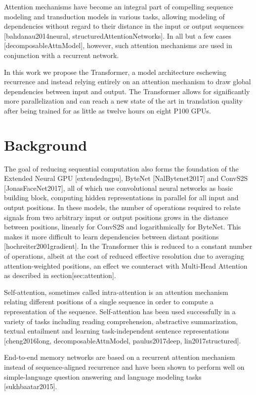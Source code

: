 \documentclass[11pt,a4paper]{article}
\begin{document}
Attention mechanisms have become an integral part of compelling sequence modeling and transduction models in various tasks, allowing modeling of dependencies without regard to their distance in the input or output sequences [bahdanau2014neural, structuredAttentionNetworks]. In all but a few cases [decomposableAttnModel], however, such attention mechanisms are used in conjunction with a recurrent network.

In this work we propose the Transformer, a model architecture eschewing recurrence and instead relying entirely on an attention mechanism to draw global dependencies between input and output. The Transformer allows for significantly more parallelization and can reach a new state of the art in translation quality after being trained for as little as twelve hours on eight P100 GPUs.

\section{Background}

The goal of reducing sequential computation also forms the foundation of the Extended Neural GPU [extendedngpu], ByteNet [NalBytenet2017] and ConvS2S [JonasFaceNet2017], all of which use convolutional neural networks as basic building block, computing hidden representations in parallel for all input and output positions. In these models, the number of operations required to relate signals from two arbitrary input or output positions grows in the distance between positions, linearly for ConvS2S and logarithmically for ByteNet. This makes it more difficult to learn dependencies between distant positions [hochreiter2001gradient]. In the Transformer this is reduced to a constant number of operations, albeit at the cost of reduced effective resolution due to averaging attention-weighted positions, an effect we counteract with Multi-Head Attention as described in section[sec:attention].

Self-attention, sometimes called intra-attention is an attention mechanism relating different positions of a single sequence in order to compute a representation of the sequence. Self-attention has been used successfully in a variety of tasks including reading comprehension, abstractive summarization, textual entailment and learning task-independent sentence representations [cheng2016long, decomposableAttnModel, paulus2017deep, lin2017structured].

End-to-end memory networks are based on a recurrent attention mechanism instead of sequence-aligned recurrence and have been shown to perform well on simple-language question answering and language modeling tasks [sukhbaatar2015].
\end{document}
